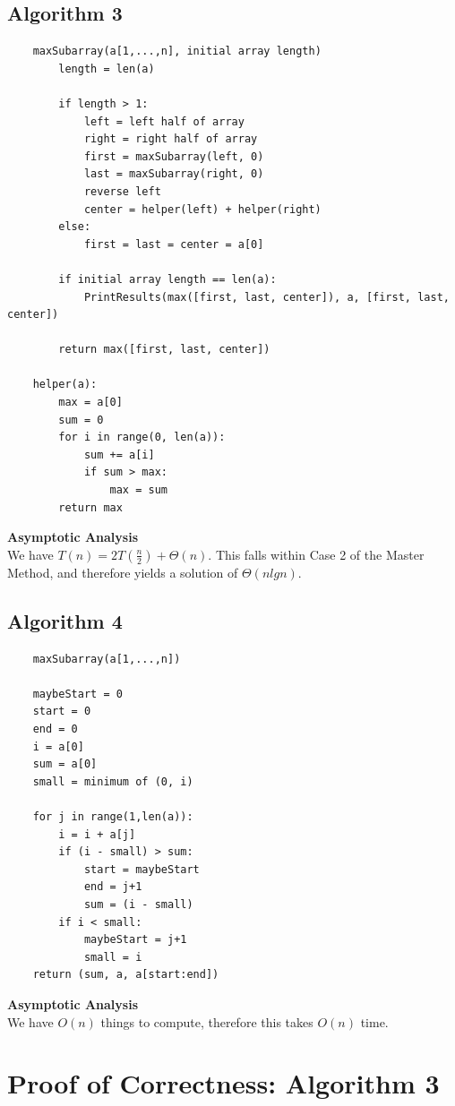 \documentclass[11pt,letterpaper]{article}
\begin{document}
\subsection{Algorithm 3}
\begin{verbatim}
    maxSubarray(a[1,...,n], initial array length)
        length = len(a)

        if length > 1:
            left = left half of array
            right = right half of array
            first = maxSubarray(left, 0)
            last = maxSubarray(right, 0)
            reverse left
            center = helper(left) + helper(right)
        else:
            first = last = center = a[0]

        if initial array length == len(a):
            PrintResults(max([first, last, center]), a, [first, last, center])

        return max([first, last, center])

    helper(a):
        max = a[0]
        sum = 0
        for i in range(0, len(a)):
            sum += a[i]
            if sum > max:
                max = sum
        return max
\end{verbatim}
\textbf{Asymptotic Analysis}\\
We have $T(n) = 2T(\frac{n}{2}) + \Theta(n)$. This falls within Case 2 of the Master Method, and therefore yields a solution of $\Theta(nlgn)$.

\subsection{Algorithm 4}
\begin{verbatim}
    maxSubarray(a[1,...,n])

    maybeStart = 0
    start = 0
    end = 0
    i = a[0]
    sum = a[0]
    small = minimum of (0, i)

    for j in range(1,len(a)):
        i = i + a[j]
        if (i - small) > sum:
            start = maybeStart
            end = j+1
            sum = (i - small)
        if i < small:
            maybeStart = j+1
            small = i
    return (sum, a, a[start:end])
\end{verbatim}
\textbf{Asymptotic Analysis}\\
We have $O(n)$ things to compute, therefore this takes $O(n)$ time.


\section{Proof of Correctness: Algorithm 3}
\end{document}
